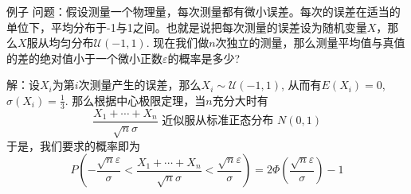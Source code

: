 \begin{frame}

\begin{block}{例子}
问题：假设测量一个物理量，每次测量都有微小误差。每次的误差在适当的单位下，平均分布于-1与1之间。也就是说把每次测量的误差设为随机变量$X$，那么$X$服从均匀分布$\mathcal{U}(-1,1)$. 现在我们做$n$次独立的测量，那么测量平均值与真值的差的绝对值小于一个微小正数$\varepsilon$的概率是多少?

\vspace{1em}
\pause

解：设$X_i$为第$i$次测量产生的误差，那么$X_i \sim \mathcal{U}(-1,1)$, 从而有$E(X_i) = 0$, $\sigma(X_i) = \frac{1}{3}$. 那么根据中心极限定理，当$n$充分大时有
\[\dfrac{X_1+\cdots+X_n}{\sqrt{n}\sigma} \text{ 近似服从标准正态分布 } N(0,1)\]
于是，我们要求的概率即为
\[P\left( -\dfrac{\sqrt{n}\varepsilon}{\sigma} < \dfrac{X_1+\cdots+X_n}{\sqrt{n}\sigma} < \dfrac{\sqrt{n}\varepsilon}{\sigma} \right) = 2\Phi\left( \dfrac{\sqrt{n}\varepsilon}{\sigma} \right) - 1\]
\end{block}

\end{frame}












